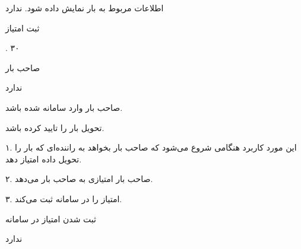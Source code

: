 اطلاعات مربوط به بار نمایش داده شود.
ندارد

\newpage

ثبت امتیاز

.
۳۰

صاحب بار

ندارد


صاحب بار وارد سامانه شده باشد.

تحویل بار را تایید کرده باشد.


۱. این مورد کاربرد هنگامی شروع می‌شود که صاحب بار بخواهد به راننده‌ای که بار را تحویل داده امتیاز دهد.

۲. صاحب بار امتیازی به صاحب بار می‌دهد.

۳. امتیاز را در سامانه ثبت می‌کند.

ثبت شدن امتیاز در سامانه

ندارد
